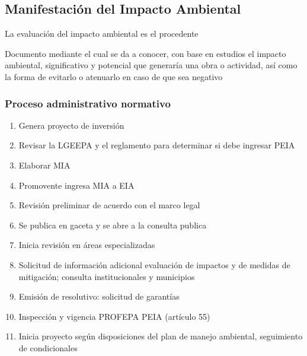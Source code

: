 \subsection{Manifestación del Impacto Ambiental}
La evaluación del impacto ambiental es el procedente

\begin{definition}[MIA]
    Documento mediante el cual se da a conocer, con base en estudios el impacto ambiental, significativo y potencial que generaría una obra o actividad, así como la forma de evitarlo o atenuarlo en caso de que sea negativo
\end{definition}
\subsubsection{Proceso administrativo normativo}
\begin{enumerate}
    \item Genera proyecto de inversión
    \item Revisar la LGEEPA y el reglamento para determinar si debe ingresar PEIA
    \item Elaborar MIA
    \item Promovente ingresa MIA a EIA
    \item Revisión preliminar de acuerdo con el marco legal
    \item Se publica en gaceta y se abre a la consulta publica
    \item Inicia revisión en áreas especializadas
    \item Solicitud de información adicional evaluación de impactos y de medidas de mitigación; consulta institucionales y municipios
    \item Emisión de resolutivo: solicitud de garantías
    \item Inspección y vigencia PROFEPA PEIA (artículo 55)
    \item Inicia proyecto según disposiciones del plan de manejo ambiental, seguimiento de condicionales
\end{enumerate}
